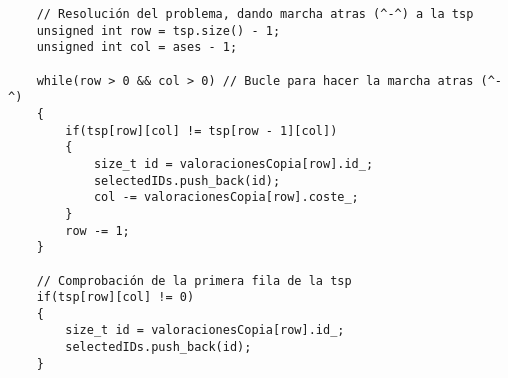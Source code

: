 \begin{lstlisting}
    // Resolución del problema, dando marcha atras (^-^) a la tsp
    unsigned int row = tsp.size() - 1;
    unsigned int col = ases - 1;
    
    while(row > 0 && col > 0) // Bucle para hacer la marcha atras (^-^)
    {
        if(tsp[row][col] != tsp[row - 1][col])
        {
            size_t id = valoracionesCopia[row].id_;
            selectedIDs.push_back(id);
            col -= valoracionesCopia[row].coste_;
        }
        row -= 1;
    }
    
    // Comprobación de la primera fila de la tsp
    if(tsp[row][col] != 0)
    {
        size_t id = valoracionesCopia[row].id_;
        selectedIDs.push_back(id);
    }
\end{lstlisting}
